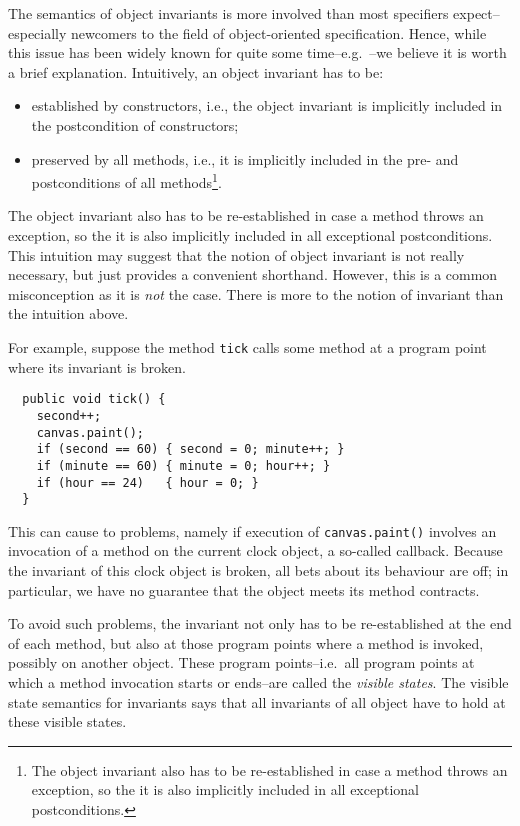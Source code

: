 \documentclass{llncs}
\begin{document}
The semantics of object invariants is more involved than most specifiers
expect--especially newcomers to the field of object-oriented specification.
Hence, while this issue has been widely known for quite some time--e.g.\
\cite{Szyperski98}--we believe it is worth a brief explanation.
%
Intuitively, an object invariant has to be:
\begin{itemize}
  \item established by constructors, i.e., the object invariant is implicitly
    included in the postcondition of constructors;
  \item preserved by all methods, i.e., it is implicitly included in the pre-
    and postconditions of all methods\footnote{The object invariant also has 
    to be re-established in case a method throws an exception, so the it is also 
    implicitly included in all exceptional postconditions.}.
\end{itemize}
The object invariant also has to be re-established in case a method throws an exception,
so the it is also implicitly included in all exceptional postconditions.
%
This intuition may suggest that the notion of object invariant is not really
necessary, but just provides a convenient shorthand.  However, this is a
common misconception as it is \emph{not} the case. There is more to the notion
of invariant than the intuition above.

For example, suppose the method \texttt{tick} calls some method
at a program point where its invariant is broken.
\begin{verbatim}
  public void tick() {
    second++;
    canvas.paint();
    if (second == 60) { second = 0; minute++; }
    if (minute == 60) { minute = 0; hour++; }
    if (hour == 24)   { hour = 0; }
  }
\end{verbatim}
This can cause to problems, namely if execution of \texttt{canvas.paint()} 
involves an invocation of a method on the current clock object, a so-called 
callback. Because the invariant of this clock object is broken, all bets
about its behaviour are off; in particular, we  have no guarantee that the
object meets its method contracts.

To avoid such problems, the invariant not only has to be re-established at the
end of each method, but also at those program points where a method is invoked,
possibly on another object. These program points--i.e.\ all program points
at which a method invocation starts or ends--are called the \emph{visible
states}. The visible state semantics for invariants says that all invariants
of all object have to hold at these visible states.
\end{document}
